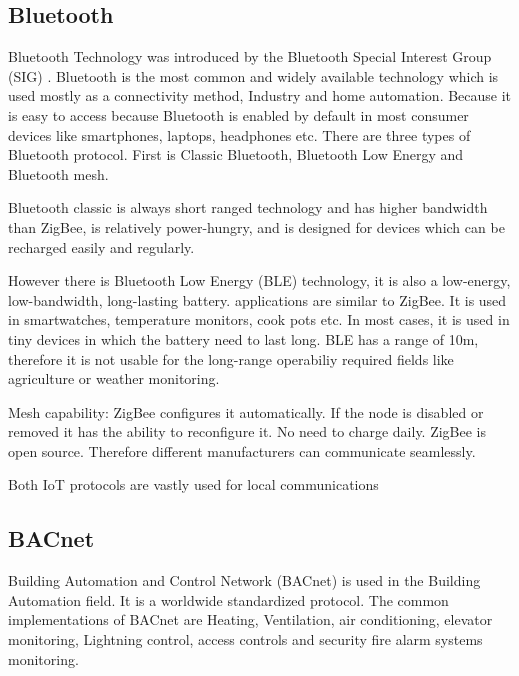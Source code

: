 \documentclass[conference]{IEEEtran}
\begin{document}
\subsection{Bluetooth}

Bluetooth Technology was introduced by the Bluetooth Special Interest Group (SIG)  \cite{DIGI2021}.
Bluetooth is the most common and widely available technology which is used mostly as a connectivity method, Industry and home automation. Because it is easy to access because Bluetooth is enabled by default in most consumer devices like smartphones, laptops, headphones etc. There are three types of Bluetooth protocol. First is Classic Bluetooth, Bluetooth Low Energy and Bluetooth mesh. 

Bluetooth classic is always short ranged technology and has higher bandwidth than ZigBee, is relatively power-hungry, and is designed for devices which can be recharged easily and regularly. \cite{DIGI2021}

However there is Bluetooth Low Energy (BLE) technology, it is also a low-energy, low-bandwidth, long-lasting battery. applications are similar to ZigBee. It is used in smartwatches, temperature monitors, cook pots etc. In most cases, it is used in tiny devices in which the battery need to last long. BLE has a range of 10m, therefore it is not usable for the long-range operabiliy required fields like agriculture or weather monitoring. \cite{DIGI2021}

Mesh capability: ZigBee configures it automatically. If the node is disabled or removed it has the ability to reconfigure it. No need to charge daily. ZigBee is open source. Therefore different manufacturers can communicate seamlessly.\cite{DIGI2021}


Both IoT protocols are vastly used for local communications 

\subsection{BACnet}
Building Automation and Control Network (BACnet) is used in the Building Automation field. It is a worldwide standardized protocol. The common implementations of BACnet are Heating, Ventilation, air conditioning, elevator monitoring, Lightning control, access controls and security fire alarm systems monitoring. \cite{BACnet} \\
\end{document}
